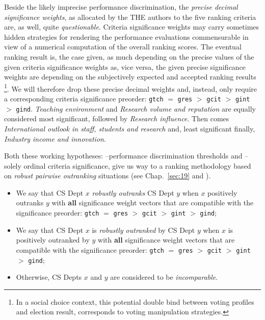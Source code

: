 Beside the likely imprecise performance discrimination, the \emph{precise decimal significance weights}, as allocated by the THE authors to the five ranking criteria are, as well, quite \emph{questionable}. Criteria significance weights may carry sometimes hidden strategies for rendering the performance evaluations commensurable in view of a numerical computation of the overall ranking scores. The eventual ranking result is, the case given, as much depending on the precise values of the given criteria significance weights as, vice versa, the given precise significance weights are depending on the subjectively expected and accepted ranking results \footnote{In a social choice context, this potential double bind between voting profiles and election result, corresponds to voting manipulation strategies.}. We will therefore drop these precise decimal weights and, instead, only require a corresponding criteria significance preorder: \texttt{gtch} $=$ \texttt{gres} $>$ \texttt{gcit} $>$ \texttt{gint} $>$ \texttt{gind}. \emph{Teaching environment} and \emph{Research volume and reputation} are equally considered most significant, followed by \emph{Research influence}. Then comes \emph{International outlook in staff, students and research} and, least significant finally, \emph{Industry income and innovation}.

Both these working hypotheses: --performance discrimination thresholds and --solely ordinal criteria significance, give us way to a ranking methodology based on \emph{robust pairwise outranking} situations (see Chap.~\ref{sec:19} and \citep{BIS-2004b}).
\begin{definition}\label{def:13.1}
\begin{itemize}[topsep=1pt]
\item We say that CS Dept $x$ \emph{robustly outranks} CS Dept $y$ when $x$ positively outranks $y$ with \textbf{all} significance weight vectors that are compatible with the significance preorder: \texttt{gtch} $=$ \texttt{gres} $>$ \texttt{gcit} $>$ \texttt{gint} $>$ \texttt{gind};
\item We say that CS Dept $x$ is \emph{robustly outranked} by CS Dept $y$ when $x$ is positively outranked by $y$ with \textbf{all} significance weight vectors that are compatible with the significance preorder: \texttt{gtch} $=$ \texttt{gres} $>$ \texttt{gcit} $>$ \texttt{gint} $>$ \texttt{gind};
\item Otherwise, CS Depts $x$ and $y$ are considered to be \emph{incomparable}.
\end{itemize}
\end{definition}

